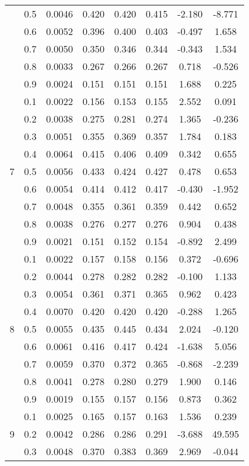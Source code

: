 \documentclass[11pt,a4paper]{report}
\begin{document}
\begin{longtable}{ | c | c || c | c | c | c | c | c | }
 & 0.5 & 0.0046 & 0.420 & 0.420 & 0.415 & -2.180 & -8.771 \\
 & 0.6 & 0.0052 & 0.396 & 0.400 & 0.403 & -0.497 & 1.658 \\
 & 0.7 & 0.0050 & 0.350 & 0.346 & 0.344 & -0.343 & 1.534 \\
 & 0.8 & 0.0033 & 0.267 & 0.266 & 0.267 & 0.718 & -0.526 \\
 & 0.9 & 0.0024 & 0.151 & 0.151 & 0.151 & 1.688 & 0.225 \\
 \hline
\multirow{9}{*}{7} & 0.1 & 0.0022 & 0.156 & 0.153 & 0.155 & 2.552 & 0.091 \\
 & 0.2 & 0.0038 & 0.275 & 0.281 & 0.274 & 1.365 & -0.236 \\
 & 0.3 & 0.0051 & 0.355 & 0.369 & 0.357 & 1.784 & 0.183 \\
 & 0.4 & 0.0064 & 0.415 & 0.406 & 0.409 & 0.342 & 0.655 \\
 & 0.5 & 0.0056 & 0.433 & 0.424 & 0.427 & 0.478 & 0.653 \\
 & 0.6 & 0.0054 & 0.414 & 0.412 & 0.417 & -0.430 & -1.952 \\
 & 0.7 & 0.0048 & 0.355 & 0.361 & 0.359 & 0.442 & 0.652 \\
 & 0.8 & 0.0038 & 0.276 & 0.277 & 0.276 & 0.904 & 0.438 \\
 & 0.9 & 0.0021 & 0.151 & 0.152 & 0.154 & -0.892 & 2.499 \\
 \hline
\multirow{9}{*}{8} & 0.1 & 0.0022 & 0.157 & 0.158 & 0.156 & 0.372 & -0.696 \\
 & 0.2 & 0.0044 & 0.278 & 0.282 & 0.282 & -0.100 & 1.133 \\
 & 0.3 & 0.0054 & 0.361 & 0.371 & 0.365 & 0.962 & 0.423 \\
 & 0.4 & 0.0070 & 0.420 & 0.420 & 0.420 & -0.288 & 1.265 \\
 & 0.5 & 0.0055 & 0.435 & 0.445 & 0.434 & 2.024 & -0.120 \\
 & 0.6 & 0.0061 & 0.416 & 0.417 & 0.424 & -1.638 & 5.056 \\
 & 0.7 & 0.0059 & 0.370 & 0.372 & 0.365 & -0.868 & -2.239 \\
 & 0.8 & 0.0041 & 0.278 & 0.280 & 0.279 & 1.900 & 0.146 \\
 & 0.9 & 0.0019 & 0.155 & 0.157 & 0.156 & 0.873 & 0.362 \\
 \hline
\multirow{9}{*}{9} & 0.1 & 0.0025 & 0.165 & 0.157 & 0.163 & 1.536 & 0.239 \\
 & 0.2 & 0.0042 & 0.286 & 0.286 & 0.291 & -3.688 & 49.595 \\
 & 0.3 & 0.0048 & 0.370 & 0.383 & 0.369 & 2.969 & -0.044 \\

\end{longtable}
\end{document}
